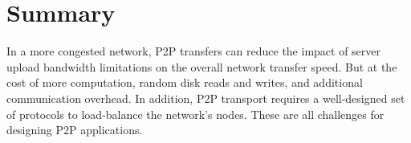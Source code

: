 \section{Summary}
In a more congested network, P2P transfers can reduce the impact of server upload bandwidth limitations on the overall network transfer speed. But at the cost of more computation, random disk reads and writes, and additional communication overhead. In addition, P2P transport requires a well-designed set of protocols to load-balance the network's nodes. These are all challenges for designing P2P applications.